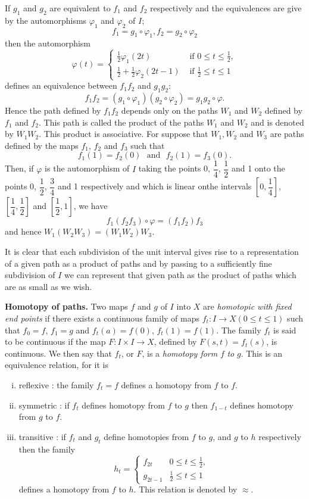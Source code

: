 If $g_1$ and $g_2$ are equivalent to $f_1$ and $f_2$ respectively and
the equivalences are give by the automorphisms $\varphi_1$ and
$\varphi_2$ of $I$;  
$$
f_1=g_1 \circ \varphi_1, f_2=g_2 \circ \varphi_2 
$$
then the automorphism
$$ 
\varphi (t)=
\begin{cases}
\frac{1}{2} \varphi_1(2t) & \text{ if } 0 \leq t \leq \frac{1}{2},\\ 
\frac{1}{2} +\frac{1}{2} \varphi_2(2t-1) & \text{ if } \frac{1}{2}
\leq t \leq 1 
\end{cases}
$$
defines an equivalence between $f_1 f_2$ and $g_1 g_2$:
$$
f_1 f_2 =(g_1 \circ  \varphi_1) (g_2 \circ  \varphi_2) = g_1 g_2 \circ
\varphi.  
$$
Hence the path defined by $f_1 f_2$ depends only on the paths $W_1$ and
$W_2$ defined by $f_1$ and $f_2$. This path is called the product of
the paths $W_1$ and $W_2$ and is denoted by $W_1 W_2$. 
This product is associative. For suppose that
$W_1, W_2$ and $W_3$ are paths defined by the maps $f_1$, $f_2$ and
$f_3$ such that 
$$
f_1 (1)=f_2(0) \text{~ and~ } f_2 (1)=f_3(0). 
$$
Then, if $\varphi$ is the automorphism of $I$ taking the points 0,
$\dfrac{1}{4}$, $\dfrac{1}{2}$ and 1 onto the points $0$,
$\dfrac{1}{2}$, $\dfrac{3}{4}$ and 1 respectively and which is
linear on\pageoriginale the intervals $[0,\dfrac{1}{4}]$, $
[\dfrac{1}{4},\dfrac{1}{2}]$ and $[\dfrac{1}{2}, 1]$, we have  
$$
f_1(f_2 f_3) \circ  \varphi= (f_1 f_2)f_3 
$$
and hence $W_1(W_2 W_3)= (W_1 W_2)W_3$. 

It is clear that each subdivision of the unit interval gives rise to a
representation of a given  path as a product of paths and by passing
to a sufficiently fine subdivision of $I$ we can represent that given
path as the product of paths which are as small as we wish. 

\medskip
\noindent
\textbf{Homotopy of paths.}
 Two maps $f$ and $g$ of $I$ into $X$ are
\textit{homotopic with fixed end points} if there exists a continuous
family of maps $f_t:I \to X (0 \leq t \leq 1)$ such that $f_0=f$,
$f_1=g$ and $f_t(a)=f(0)$, $f_t(1)=f(1)$. The family $f_t$ is said to
be continuous if the map $F:I \times I \to X$, defined by $F
(s,t)=f_t(s)$, is continuous. We then say that $f_t$, or $F$, is a
\textit{homotopy form} $f$ \textit{to} $g$. This is an equivalence
relation, for it is 
\begin{enumerate}[(i)]
\item reflexive : the family $f_t=f$ defines a homotopy from $f$ to
  $f$.

\item symmetric : if $f_t$ defines homotopy from $f$ to $g$ then
  $f_{1-t}$ defines homotopy from $g$ to $f$. 

\item transitive : if $f_t$ and $g_t$ define homotopies from $f$ to
  $g$, and $g$ to $h$ respectively then the family 
$$
h_t= 
\begin{cases}
f_{2t} & 0 \leq t \leq \frac{1}{2},\\
g_{2t-1} & \frac{1}{2} \leq t \leq 1
\end{cases}
$$
defines a homotopy from $f$ to $h$. This relation is denoted by $\approx$.
\end{enumerate}

